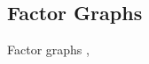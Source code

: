 \documentclass{article}
\begin{document}
	\subsection{Factor Graphs} 
	\label{sec:factor-graphs}
	Factor graphs 
	\cite{kschischang2001sumproduct},
\end{document}
